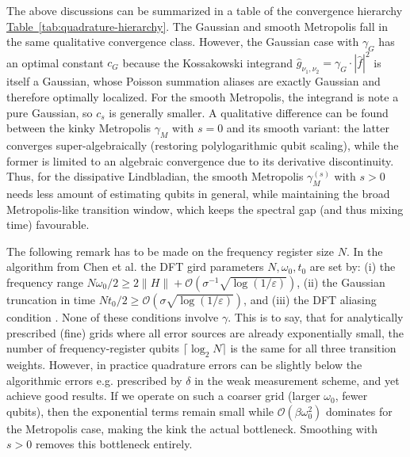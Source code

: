 The above discussions can be summarized in a table of the convergence hierarchy \hyperref[tab:quadrature-hierarchy]{Table~\ref*{tab:quadrature-hierarchy}}. The Gaussian and smooth Metropolis fall in the same qualitative convergence class. However, the Gaussian case with $\gamma_G$ has an optimal constant $c_G$ because the Kossakowski integrand $\hat{g}_{\nu_1, \nu_2} = \gamma_G \cdot |\hat{f}|^2$ is itself a Gaussian, whose Poisson summation aliases are exactly Gaussian and therefore optimally localized. For the smooth Metropolis, the integrand is note a pure Gaussian, so $c_s$ is generally smaller. A qualitative difference can be found between the kinky Metropolis $\gamma_M$ with $s=0$ and its smooth variant: the latter converges super-algebraically (restoring polylogarithmic qubit scaling), while the former is limited to an algebraic convergence due to its derivative discontinuity. Thus, for the dissipative Lindbladian, the smooth Metropolis $\gamma_M^{(s)}$ with $s > 0$ needs less amount of estimating qubits in general, while maintaining the broad Metropolis-like transition window, which keeps the spectral gap (and thus mixing time) favourable.


The following remark has to be made on the frequency register size $N$. In the algorithm from Chen et al. the DFT gird parameters $N, \omega_0, t_0$ are set by: (i) the frequency range $N\omega_0/2 \geq 2\|H\| + \mathcal{O}(\sigma^{-1}\sqrt{\log(1/\varepsilon)})$, (ii) the Gaussian truncation in time $Nt_0/2 \geq \mathcal{O}(\sigma\sqrt{\log(1/\varepsilon)})$, and (iii) the DFT aliasing condition \cite[Proposition A.7]{chen2023quantum}. None of these conditions involve $\gamma$. This is to say, that for analytically prescribed (fine) grids where all error sources are already exponentially small, the number of frequency-register qubits $\lceil\log_2 N\rceil$ is the same for all three transition weights. However, in practice quadrature errors can be slightly below the algorithmic errors e.g. prescribed by $\delta$ in the weak measurement scheme, and yet achieve good results. If we operate on such a coarser grid (larger $\omega_0$, fewer qubits), then the exponential terms remain small while $\mathcal{O}(\beta\omega_0^2)$ dominates for the Metropolis case, making the kink the actual bottleneck. Smoothing with $s > 0$ removes this bottleneck entirely.

